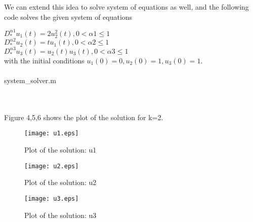 \newpage
We can extend this idea to solve system of equations as well, and the following code solves the given system of equations

$D_*^{\alpha1}u_1(t) = 2u_2^2(t), 0 < \alpha1\leq 1$ \\
$D_*^{\alpha2}u_2(t) = tu_1(t), 0 < \alpha2 \leq 1$ \\
$D_*^{\alpha3}u_3(t) = u_2(t)u_3(t), 0<\alpha3 \leq 1$ \\
with the initial conditions $u_1(0)=0, u_2(0)=1,u_3(0)=1$.\\~\\

system\_solver.m

 {\selectfont \footnotesize{}}
 \\~\\
 
 Figure 4,5,6 shows the plot of the solution for k=2. 
 
 \begin{figure}

\centering

    \texttt{[image: u1.eps]}

    \caption{Plot of the solution: u1}
     \texttt{[image: u2.eps]}

    \caption{Plot of the solution: u2}

 \texttt{[image: u3.eps]}

    \caption{Plot of the solution: u3}

\end{figure} 


 
 
 
 
 